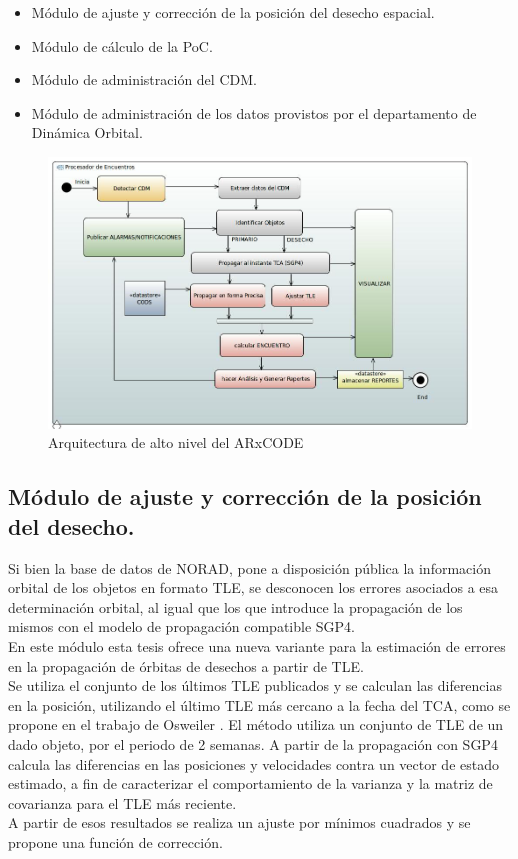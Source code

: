\begin{itemize}
\item M\'odulo de ajuste y correcci\'on de la posici\'on del desecho espacial.\\
\item M\'odulo de c\'alculo de la PoC.\\
\item M\'odulo de administraci\'on del CDM.\\
\item M\'odulo de administraci\'on de los datos provistos por el departamento de Din\'amica Orbital.\\
\end{itemize}
\begin{figure}[!h]
\centering
\includegraphics[width=\textwidth]{imagenes/arxcodencuentros}
\caption{Arquitectura de alto nivel del ARxCODE}
\end{figure}


\subsection*{M\'odulo de ajuste y correcci\'on de la posici\'on del desecho.}
Si bien la base de datos de NORAD, pone a disposici\'on p\'ublica la informaci\'on orbital de los objetos en formato TLE, se desconocen los errores asociados a esa determinaci\'on orbital, al igual que los que introduce la propagaci\'on de los mismos con el modelo de propagaci\'on compatible SGP4.\\
En este m\'odulo esta tesis ofrece una nueva variante para la estimaci\'on de errores en la propagaci\'on de \'orbitas de desechos a partir de TLE.\\
Se utiliza el conjunto de los \'ultimos TLE publicados y se calculan las diferencias en la posici\'on, utilizando el \'ultimo TLE m\'as cercano a la fecha del TCA, como se propone en el trabajo de Osweiler \cite{osweiler}. El m\'etodo utiliza un conjunto de TLE de un dado objeto, por el periodo de 2 semanas. A partir de la propagaci\'on con SGP4 calcula las diferencias en las posiciones y velocidades contra un vector de estado estimado, a fin de caracterizar el comportamiento de la varianza y la matriz de covarianza para el TLE m\'as reciente.\\
A partir de esos resultados se realiza un ajuste por m\'inimos cuadrados y se propone una funci\'on de corrección.\\

